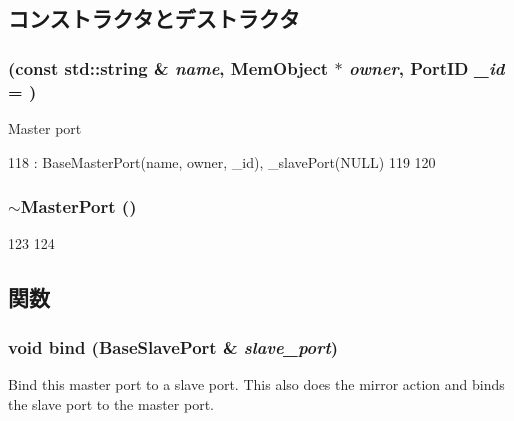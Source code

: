 \subsection{コンストラクタとデストラクタ}
\hypertarget{classMasterPort_a4a4ccf1d4533ae4ce5ac9bf88a7edfd5}{
\subsubsection[{MasterPort}]{ (const std::string \& {\em name}, \/  {\bf MemObject} $\ast$ {\em owner}, \/  {\bf PortID} {\em \_\-id} = {})}}
\label{classMasterPort_a4a4ccf1d4533ae4ce5ac9bf88a7edfd5}
Master port 


\begin{DoxyCode}
118     : BaseMasterPort(name, owner, _id), _slavePort(NULL)
119 {
120 }
\end{DoxyCode}
\hypertarget{classMasterPort_a5e846fe2c65dea8caa0c62564ce24f9f}{
\subsubsection[{$\sim$MasterPort}]{\setlength{\rightskip}{0pt plus 5cm}$\sim${\bf MasterPort} ()}}
\label{classMasterPort_a5e846fe2c65dea8caa0c62564ce24f9f}



\begin{DoxyCode}
123 {
124 }
\end{DoxyCode}


\subsection{関数}
\hypertarget{classMasterPort_a5035def22faf23d50855716f8c9602e2}{
\subsubsection[{bind}]{\setlength{\rightskip}{0pt plus 5cm}void bind ({\bf BaseSlavePort} \& {\em slave\_\-port})}}
\label{classMasterPort_a5035def22faf23d50855716f8c9602e2}
Bind this master port to a slave port. This also does the mirror action and binds the slave port to the master port. 

